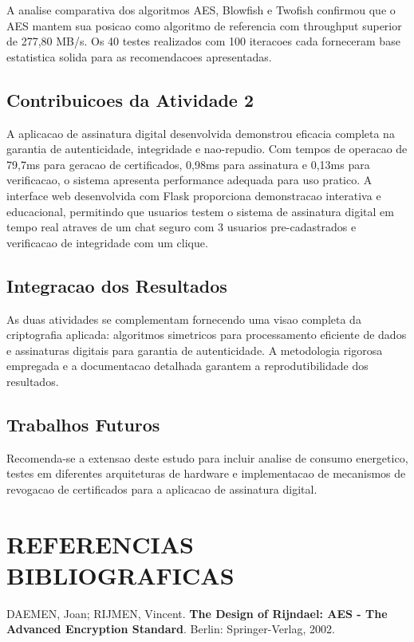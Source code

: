 \documentclass[12pt,a4paper,oneside]{article}
\begin{document}
A analise comparativa dos algoritmos AES, Blowfish e Twofish confirmou que o AES mantem sua posicao como algoritmo de referencia com throughput superior de 277,80 MB/s. Os 40 testes realizados com 100 iteracoes cada forneceram base estatistica solida para as recomendacoes apresentadas.

\subsection{Contribuicoes da Atividade 2}

A aplicacao de assinatura digital desenvolvida demonstrou eficacia completa na garantia de autenticidade, integridade e nao-repudio. Com tempos de operacao de 79,7ms para geracao de certificados, 0,98ms para assinatura e 0,13ms para verificacao, o sistema apresenta performance adequada para uso pratico. A interface web desenvolvida com Flask proporciona demonstracao interativa e educacional, permitindo que usuarios testem o sistema de assinatura digital em tempo real atraves de um chat seguro com 3 usuarios pre-cadastrados e verificacao de integridade com um clique.

\subsection{Integracao dos Resultados}

As duas atividades se complementam fornecendo uma visao completa da criptografia aplicada: algoritmos simetricos para processamento eficiente de dados e assinaturas digitais para garantia de autenticidade. A metodologia rigorosa empregada e a documentacao detalhada garantem a reprodutibilidade dos resultados.

\subsection{Trabalhos Futuros}

Recomenda-se a extensao deste estudo para incluir analise de consumo energetico, testes em diferentes arquiteturas de hardware e implementacao de mecanismos de revogacao de certificados para a aplicacao de assinatura digital.

\section{REFERENCIAS BIBLIOGRAFICAS}

DAEMEN, Joan; RIJMEN, Vincent. \textbf{The Design of Rijndael: AES - The Advanced Encryption Standard}. Berlin: Springer-Verlag, 2002.
\end{document}
